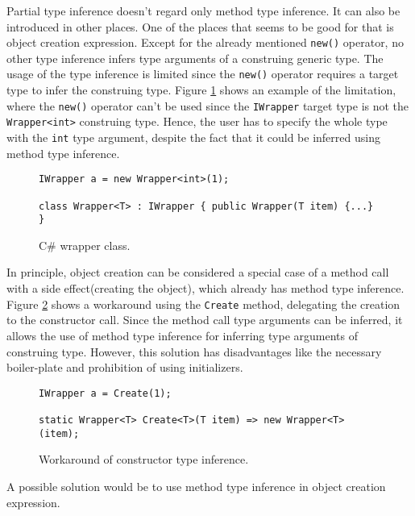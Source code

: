 \par
{}
Partial type inference doesn’t regard only method type inference. 
It can also be introduced in other places. One of the places that seems to be good for that is object creation expression. 
Except for the already mentioned \texttt{new()} operator, no other type inference infers type arguments of a construing generic type. The usage of the type inference is limited since the \texttt{new()} operator requires a target type to infer the construing type. 
Figure \ref{img34:wrapper} shows an example of the limitation, where the \texttt{new()} operator can’t be used since the \texttt{IWrapper} target type is not the \texttt{Wrapper<int>} construing type. 
Hence, the user has to specify the whole type with the \texttt{int} type argument, despite the fact that it could be inferred using method type inference.
\begin{figure}[h]
\begin{lstlisting}[style=csharp]
IWrapper a = new Wrapper<int>(1);

class Wrapper<T> : IWrapper { public Wrapper(T item) {...} }
\end{lstlisting}
\caption{C\# wrapper class.}
\label{img34:wrapper}
\end{figure}
\par
{}
In principle, object creation can be considered a special case of a method call with a side effect(creating the object), which already has method type inference. 
Figure \ref{img35:workaroung} shows a workaround using the \texttt{Create} method, delegating the creation to the constructor call. 
Since the method call type arguments can be inferred, it allows the use of method type inference for inferring type arguments of construing type. 
However, this solution has disadvantages like the necessary boiler-plate and prohibition of using initializers.
\begin{figure}[h]
\begin{lstlisting}[style=csharp]
IWrapper a = Create(1);

static Wrapper<T> Create<T>(T item) => new Wrapper<T>(item);
\end{lstlisting}
\caption{Workaround of constructor type inference.}
\label{img35:workaroung}
\end{figure}
\par
{}
A possible solution would be to use method type inference in object creation expression. 
